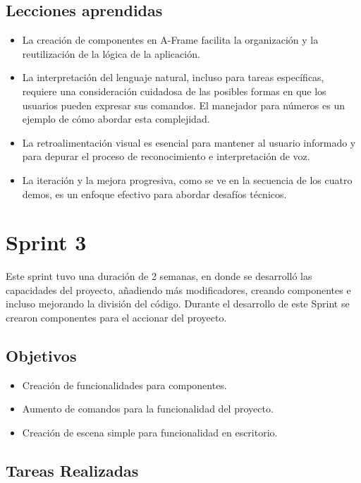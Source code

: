 \documentclass[a4paper, 12pt]{book}
\begin{document}
\subsection{Lecciones aprendidas}
\begin{itemize}
 \item La creación de componentes en A-Frame facilita la organización y la reutilización de la lógica de la aplicación.
 \item La interpretación del lenguaje natural, incluso para tareas específicas, requiere una consideración cuidadosa de las posibles formas en que los usuarios pueden expresar sus comandos. El manejador para números es un ejemplo de cómo abordar esta complejidad.
 \item La retroalimentación visual es esencial para mantener al usuario informado y para depurar el proceso de reconocimiento e interpretación de voz.
 \item La iteración y la mejora progresiva, como se ve en la secuencia de los cuatro demos, es un enfoque efectivo para abordar desafíos técnicos.
\end{itemize}

\clearpage 
\section{Sprint 3} 
\label{sec:sprint3}
Este sprint tuvo una duración de 2 semanas, en donde se desarrolló las capacidades del proyecto, añadiendo más modificadores, creando componentes e incluso mejorando la división del código.
Durante el desarrollo de este Sprint se crearon componentes para el accionar del proyecto.
\subsection{Objetivos}
\begin{itemize}
 \item Creación de funcionalidades para componentes.
 \item Aumento de comandos para la funcionalidad del proyecto.
 \item Creación de escena simple para funcionalidad en escritorio.
\end{itemize}
\subsection{Tareas Realizadas}
\end{document}

